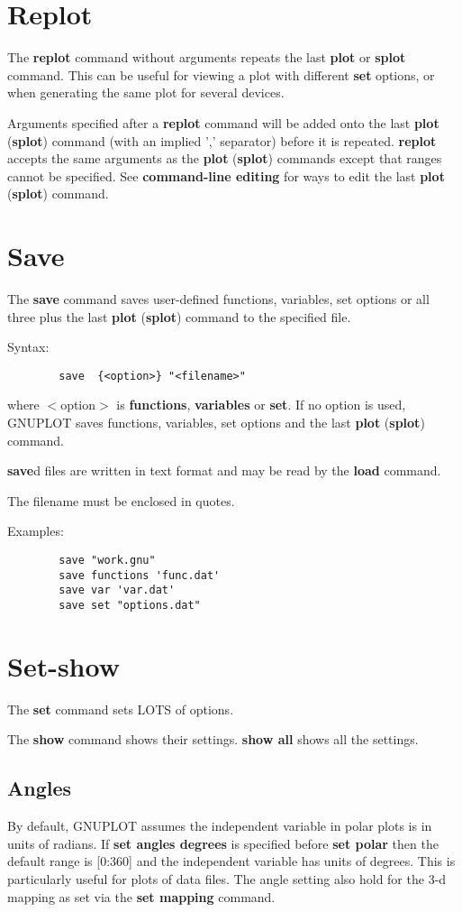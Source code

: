 \section{Replot}
The {\bf replot} command without arguments repeats the last {\bf plot} or {\bf splot}
command. This can be useful for viewing a plot with different {\bf set}
options, or when generating the same plot for several devices.

Arguments specified after a {\bf replot} command will be added onto the last
{\bf plot} ({\bf splot}) command (with an implied ',' separator) before it is
repeated. {\bf replot} accepts the same arguments as the {\bf plot} ({\bf splot})
commands except that ranges cannot be specified. See {\bf command-line
editing} for ways to edit the last {\bf plot} ({\bf splot}) command.
\section{Save}
The {\bf save} command saves user-defined functions, variables, set
options or all three plus the last {\bf plot} ({\bf splot}) command to the
specified file.

Syntax:
\begin{verbatim}
        save  {<option>} "<filename>"
\end{verbatim}

where $<$option$>$ is {\bf functions}, {\bf variables} or {\bf set}. If no option is
used, GNUPLOT saves functions, variables, set options and the last {\bf plot}
({\bf splot}) command.

{\bf save}d files are written in text format and may be read by the {\bf load}
command.

The filename must be enclosed in quotes.

Examples:

\begin{verbatim}
        save "work.gnu"
        save functions 'func.dat'
        save var 'var.dat'
        save set "options.dat"
\end{verbatim}
\section{Set-show}
The {\bf set} command sets LOTS of options.

The {\bf show} command shows their settings. {\bf show all} shows all the
settings.
\subsection{Angles}
By default, GNUPLOT assumes the independent variable in polar plots
is in units of radians. If {\bf set angles degrees} is specified before
{\bf set polar} then the default range is [0:360] and the independent
variable has units of degrees. This is particularly useful for
plots of data files. The angle setting also hold for the 3-d
mapping as set via the {\bf set mapping} command.

